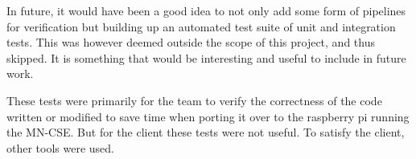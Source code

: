In future, it would have been a good idea to not only add some form of pipelines for verification but building up an automated test suite of unit and integration tests. This was however deemed outside the scope of this project, and thus skipped. It is something that would be interesting and useful to include in future work.

These tests were primarily for the team to verify the correctness of the code written or modified to save time when porting it over to the raspberry pi running the MN-CSE. But for the client these tests were not useful. To satisfy the client, other tools were used.

\clearpage
